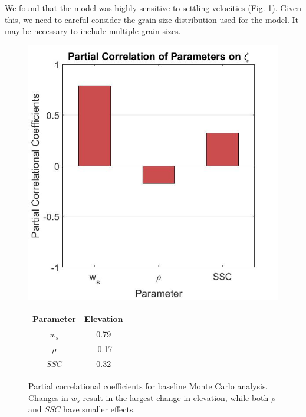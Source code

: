 \documentclass{wscpaperproc}
\theoremstyle{wsc}
\begin{document}
We found that the model was highly sensitive to settling velocities (Fig. \ref{fig:mc_partial_corr}). Given this, we need to careful consider the grain size distribution used for the model. It may be necessary to include multiple grain sizes.

\begin{figure}
	\begin{minipage}{0.49\linewidth}
		\centering
		\includegraphics[width=\textwidth]{../figures/sens_mc.jpg}
	\end{minipage}
	\hfill
	\begin{minipage}{0.49\linewidth}
		\centering
		\setlength\tabcolsep{0pt}
		\setlength\tabcolsep{20px}
		\begin{tabular}{cc}
			\hline
			Parameter & Elevation \\ \hline
			$w_s$     & 0.79      \\
			$\rho$    & -0.17     \\
			$SSC$     & 0.32      \\ \hline
		\end{tabular}
	\end{minipage}
	\caption[Partial correlational coefficients of the sediment model]{\label{fig:mc_partial_corr} Partial correlational coefficients for baseline Monte Carlo analysis. Changes in $w_s$ result in the largest change in elevation, while both $\rho$ and $SSC$ have smaller effects.}
\end{figure}
\end{document}
